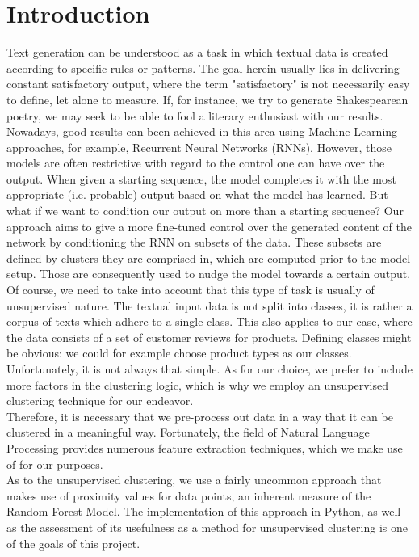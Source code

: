 \documentclass[]{report}
\begin{document}
\chapter{Introduction}
Text generation can be understood as a task in which textual data is created according to specific rules or patterns. The goal herein usually lies in delivering constant satisfactory output, where the term "satisfactory" is not necessarily easy to define, let alone to measure. If, for instance, we try to generate Shakespearean poetry, we may seek to be able to fool a literary enthusiast with our results. Nowadays, good results can been achieved in this area using Machine Learning approaches, for example, Recurrent Neural Networks (RNNs)\cite{karpathy}. However, those models are often restrictive with regard to the control one can have over the output. When given a starting sequence, the model completes it with the most appropriate (i.e. probable) output based on what the model has learned. But what if we want to condition our output on more than a starting sequence? Our approach aims to give a more fine-tuned control over the generated content of the network by conditioning the RNN on subsets of the data. These subsets are defined by clusters they are comprised in, which are computed prior to the model setup. Those are consequently used to nudge the model towards a certain output. \\
Of course, we need to take into account that this type of task is usually of unsupervised nature. The textual input data is not split into classes, it is rather a corpus of texts which adhere to a single class. This also applies to our case, where the data consists of a set of customer reviews for products. Defining classes might be obvious: we could for example choose product types as our classes. Unfortunately, it is not always that simple. As for our choice, we prefer to include more factors in the clustering logic, which is why we employ an unsupervised clustering technique for our endeavor. \\
Therefore, it is necessary that we pre-process out data in a way that it can be clustered in a meaningful way. Fortunately, the field of Natural Language Processing provides numerous feature extraction techniques, which we make use of for our purposes. \\
As to the unsupervised clustering, we use a fairly uncommon approach that makes use of proximity values for data points, an inherent measure of the Random Forest Model. The implementation of this approach in Python, as well as the assessment of its usefulness as a method for unsupervised clustering is one of the goals of this project.
\end{document}
